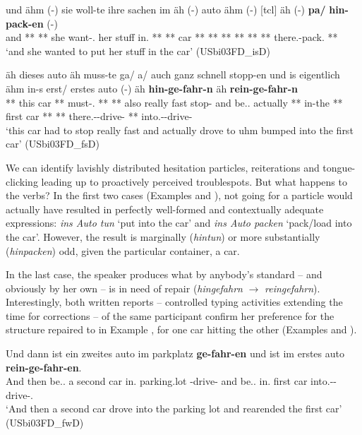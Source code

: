 \documentclass[output=paper,colorlinks,citecolor=brown]{langscibook}
\begin{document}
\pagebreak
\ex \label{ex:kelleretal:hinpacken}
\gll und ähm (-) sie woll-te ihre sachen im äh (-) auto ähm (-) [tcl] äh (-) \textbf{pa/} \textbf{hin-pack-en} (-) \\
and {**} {**} she want-\Pst.\Tsg{} her stuff in.\Dat{} {**} {**} car {**} {**} {**} {**} {**} {**} there.\Vpart{}-pack.\Inf{} {**}\\
\glt `and she wanted to put her stuff in the car' (USbi03FD\_isD)

\ex \label{ex:kelleretal:hingefahrn} 
\gll äh dieses auto äh muss-te ga/ a/ auch ganz schnell stopp-en und is eigentlich ähm in-s erst/ erstes auto (-) äh \textbf{hin-ge-fahr-n} äh \textbf{rein-ge-fahr-n}\\
{**} this car {**} must-\Pst.\Tsg{} {**} {**} also really fast stop-\Inf{} and be.\Prs.\Tsg{} actually {**} in-the {**} first car {**} {**} there.\Vpart{}-\Ptcp{}-drive-\Ptcp{} {**} into.\Vpart{}-\Ptcp{}-drive-\Ptcp{}\\
\glt `this car had to stop really fast and actually drove to uhm bumped into the first car' (USbi03FD\_fsD)
\z 

We can identify lavishly distributed hesitation particles, reiterations and tongue\hyp clicking leading up to proactively perceived troublespots. But what happens to the verbs? In the first two cases (Examples  and ), not going for a particle would actually have resulted in perfectly well-formed and contextually adequate expressions: \textit{ins Auto tun} `put into the car' and \textit{ins Auto packen} `pack/load into the car'. However, the result is marginally (\textit{hintun}) or more substantially (\textit{hinpacken}) odd, given the particular container, a car.

In the last case, the speaker produces what by anybody's standard -- and obviously by her own -- is in need of repair (\textit{hingefahrn} $\rightarrow$ \textit{reingefahrn}). Interestingly, both written reports -- controlled typing activities extending the time for corrections -- of the same participant confirm her preference for the structure repaired to in Example , for one car hitting the other (Examples  and ).

\ea
\label{ex:kelleretal:zweties}
\gll Und dann ist ein zweites auto im parkplatz \textbf{ge-fahr-en} und ist im erstes auto \textbf{rein-ge-fahr-en}.\\
And then be.\Prs.\Tsg{} a second car in.\Dat{} parking.lot \Ptcp{}-drive-\Ptcp{} and be.\Prs.\Tsg{} in.\Dat{} first car into.\Vpart{}-\Ptcp{}-drive-\Ptcp{}. \\
\glt `And then a second car drove into the parking lot and rearended the first car' (USbi03FD\_fwD)
\end{document}
